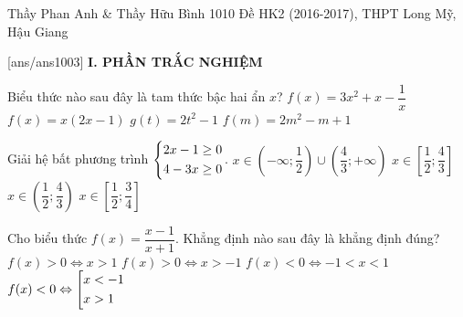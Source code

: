 \begin{name}
{Thầy Phan Anh \& Thầy Hữu Bình}
{1010 Đề HK2 (2016-2017), THPT Long Mỹ, Hậu Giang}
	\end{name}
	\setcounter{ex}{0}\setcounter{bt}{0}
	[ans/ans1003]
\noindent\textbf{I. PHẦN TRẮC NGHIỆM}

\begin{ex}%
	Biểu thức nào sau đây là tam thức bậc hai ẩn $x$?
	\choice
	{$f(x)=3x^2+x-\dfrac{1}{x}$}
	{\True $f(x)=x(2x-1)$}
	{$g(t)=2t^2-1$}
	{$f(m)=2m^2-m+1$}
\end{ex}
\begin{ex}%
	Giải hệ bất phương trình $\left\{\begin{aligned}&2x-1\ge0\\&4-3x\ge0\end{aligned}\right.$.
	\choice
	{$x\in\left(-\infty;\dfrac{1}{2}\right)\cup\left(\dfrac{4}{3};+\infty\right)$}
	{\True $x\in\left[\dfrac{1}{2};\dfrac{4}{3}\right]$}
	{$x\in\left(\dfrac{1}{2};\dfrac{4}{3}\right)$}
	{$x\in\left[\dfrac{1}{2};\dfrac{3}{4}\right]$}
\end{ex}
\begin{ex}%
	Cho biểu thức $f(x)=\dfrac{x-1}{x+1}$. Khẳng định nào sau đây là khẳng định đúng?
	\choice
	{$f(x)>0\Leftrightarrow x>1$}
	{$f(x)>0\Leftrightarrow x>-1$}
	{\True $f(x)<0\Leftrightarrow-1<x<1$}
	{$f(x)<0\Leftrightarrow\left[\begin{aligned}&x<-1\\&x>1\end{aligned}\right.$}
\end{ex}
